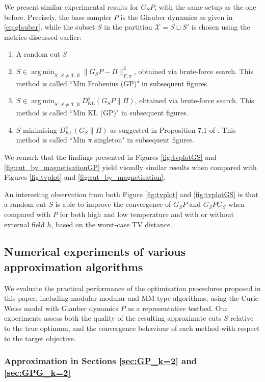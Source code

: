 \documentclass[EJP]{ejpecp} %
\DeclareMathOperator*{\argmin}{arg\,min}
\begin{document}
We present similar experimental results for $G_SP$, with the same setup as the one before. Precisely, the base sampler $P$ is the Glauber dynamics as given in \eqref{eq:glauber}, while the subset $S$ in the partition $\mathcal{X} = S \sqcup S'$ is chosen using the metrics discussed earlier:
\begin{enumerate}
    \item A random cut $S$
    \item $S \in \argmin_{S;~S \neq \mathcal{X}, \emptyset} \|G_SP - \Pi\|_{F, \pi}^2$, obtained via brute-force search. This method is called ``Min Frobenius (GP)" in subsequent figures.
    \item $S \in \argmin_{S;~S \neq \mathcal{X}, \emptyset} D_{\mathrm{KL}}^\pi (G_SP \| \Pi )$, obtained via brute-force search. This method is called ``Min KL (GP)" in subsequent figures.
    \item $S$ minimising $D_{\mathrm{KL}}^\pi (G_S \| \Pi )$ as suggested in Proposition 7.1 of \cite{GPG}. This method is called ``Min $\pi$ singleton" in subsequent figures.
\end{enumerate}
We remark that the findings presented in Figures \ref{fig:tvplotGS} and \ref{fig:cut_by_magnetisationGP} yield visually similar results when compared with Figures \ref{fig:tvplot} and \ref{fig:cut_by_magnetisation}.

An interesting observation from both Figure \ref{fig:tvplot} and \ref{fig:tvplotGS} is that a random cut $S$ is able to improve the convergence of $G_S P$ and $G_S P G_S$ when compared with $P$ for both high and low temperature and with or without external field $h$, based on the worst-case TV distance.

\subsection{Numerical experiments of various approximation algorithms}

We evaluate the practical performance of the optimisation procedures proposed in this paper, including modular-modular and MM type algorithms, using the Curie-Weiss model with Glauber dynamics $P$ as a representative testbed. Our experiments assess both the quality of the resulting approximate cuts $S$ relative to the true optimum, and the convergence behaviour of each method with respect to the target objective.

\subsubsection{Approximation in Sections \ref{sec:GP_k=2} and \ref{sec:GPG_k=2}}
\end{document}

